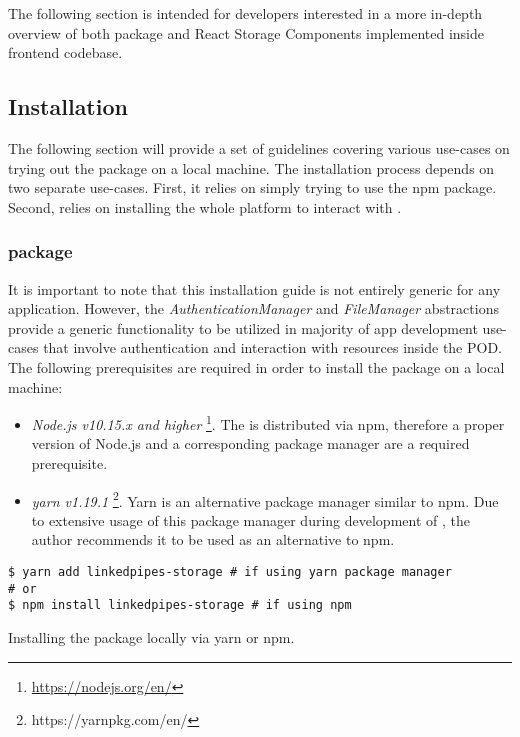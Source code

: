The following section is intended for developers interested in a more in-depth overview of both \lpas{} package and React Storage Components implemented inside \lpa{} frontend codebase.

\subsection{Installation}

The following section will provide a set of guidelines covering various use-cases on trying out the \lpas{} package on a local machine. The installation process depends on two separate use-cases. First, it relies on simply trying to use the \lpas{} npm package. Second, relies on installing the whole \lpa{} platform to interact with \solid{}. 

\subsubsection{\lpas{} package}

It is important to note that this installation guide is not entirely generic for any \solid{} application. However, the \textit{AuthenticationManager} and \textit{FileManager} abstractions provide a generic functionality to be utilized in majority of \solid{} app development use-cases that involve authentication and interaction with resources inside the POD. The following prerequisites are required in order to install the \lpas{} package on a local machine:
\begin{itemize}
    \item \textit{Node.js v10.15.x and higher} \footnote{\url{https://nodejs.org/en/}}. The \lpas{} is distributed via npm, therefore a proper version of Node.js and a corresponding package manager are a required prerequisite. 
    \item \textit{yarn v1.19.1} \footnote{https://yarnpkg.com/en/}. Yarn is an alternative package manager similar to npm. Due to extensive usage of this package manager during development of \lpas{}, the author recommends it to be used as an alternative to npm.
\end{itemize}

\begin{listing}[H]    
\begin{verbatim}
$ yarn add linkedpipes-storage # if using yarn package manager
# or
$ npm install linkedpipes-storage # if using npm 
\end{verbatim}
\caption{Installing the \lpas{} package locally via yarn or npm.} 
\label{lst:installing_lpas}
\end{listing}


